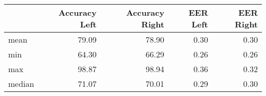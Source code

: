 \begin{tabular}{lrrrr}
\toprule
{} &  Accuracy Left &  Accuracy Right &  EER Left &  EER Right \\
\midrule
mean   &          79.09 &           78.90 &      0.30 &       0.30 \\
min    &          64.30 &           66.29 &      0.26 &       0.26 \\
max    &          98.87 &           98.94 &      0.36 &       0.32 \\
median &          71.07 &           70.01 &      0.29 &       0.30 \\
\bottomrule
\end{tabular}
